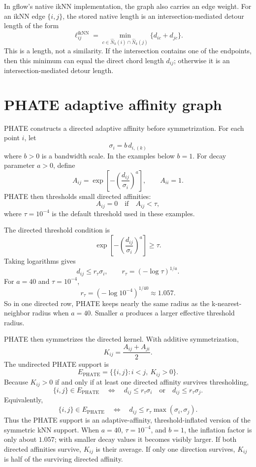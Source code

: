 \documentclass[11pt]{article}
\begin{document}
In gflow's native ikNN implementation, the graph also carries an edge weight.  For an ikNN
edge \(\{i,j\}\), the stored native length is an intersection-mediated detour length of the
form
\[
  \ell_{ij}^{\mathrm{ikNN}}
  =
  \min_{c\in \widehat{N}_k(i)\cap\widehat{N}_k(j)}
  \{d_{ic}+d_{jc}\}.
\]
This is a length, not a similarity.  If the intersection contains one of the endpoints,
then this minimum can equal the direct chord length \(d_{ij}\); otherwise it is an
intersection-mediated detour length.

\section{PHATE adaptive affinity graph}

PHATE constructs a directed adaptive affinity before symmetrization.  For each point \(i\),
let
\[
  \sigma_i=b\,d_{i,(k)}
\]
where \(b>0\) is a bandwidth scale.  In the examples below \(b=1\).  For decay parameter
\(a>0\), define
\[
  A_{ij}
  =
  \exp\left[-\left(\frac{d_{ij}}{\sigma_i}\right)^a\right],
  \qquad
  A_{ii}=1.
\]
PHATE then thresholds small directed affinities:
\[
  A_{ij}=0
  \quad\text{if}\quad
  A_{ij}<\tau,
\]
where \(\tau=10^{-4}\) is the default threshold used in these examples.

The directed threshold condition is
\[
  \exp\left[-\left(\frac{d_{ij}}{\sigma_i}\right)^a\right]\ge \tau.
\]
Taking logarithms gives
\[
  d_{ij}\le r_\tau \sigma_i,
  \qquad
  r_\tau=(-\log\tau)^{1/a}.
\]
For \(a=40\) and \(\tau=10^{-4}\),
\[
  r_\tau=(-\log 10^{-4})^{1/40}\approx 1.057.
\]
So in one directed row, PHATE keeps nearly the same radius as the k-nearest-neighbor
radius when \(a=40\).  Smaller \(a\) produces a larger effective threshold radius.

PHATE then symmetrizes the directed kernel.  With additive symmetrization,
\[
  K_{ij}=\frac{A_{ij}+A_{ji}}{2}.
\]
The undirected PHATE support is
\[
  E_{\mathrm{PHATE}}
  =
  \{\{i,j\}: i<j,\ K_{ij}>0\}.
\]
Because \(K_{ij}>0\) if and only if at least one directed affinity survives thresholding,
\[
  \{i,j\}\in E_{\mathrm{PHATE}}
  \quad\Longleftrightarrow\quad
  d_{ij}\le r_\tau\sigma_i
  \quad\text{or}\quad
  d_{ij}\le r_\tau\sigma_j.
\]
Equivalently,
\[
  \{i,j\}\in E_{\mathrm{PHATE}}
  \quad\Longleftrightarrow\quad
  d_{ij}\le r_\tau\max(\sigma_i,\sigma_j).
\]
Thus the PHATE support is an adaptive-affinity, threshold-inflated version of the symmetric
kNN support.  When \(a=40\), \(\tau=10^{-4}\), and \(b=1\), the inflation factor is only
about \(1.057\); with smaller decay values it becomes visibly larger.
If both directed affinities survive, \(K_{ij}\) is their average.  If only one direction
survives, \(K_{ij}\) is half of the surviving directed affinity.
\end{document}
